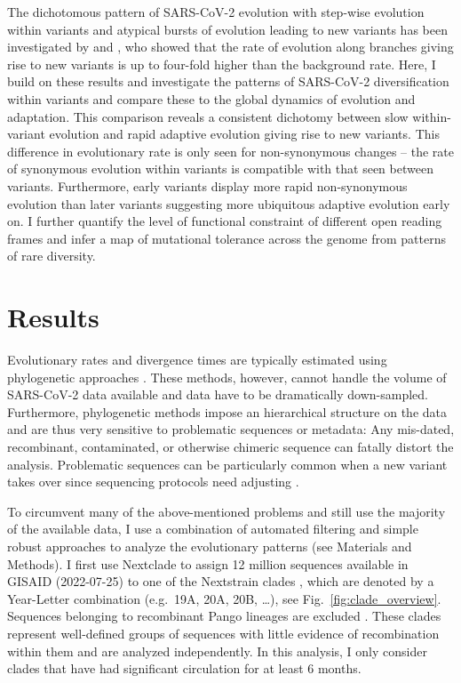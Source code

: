 \documentclass[aps,rmp, twocolumn]{revtex4}
\begin{document}
The dichotomous pattern of SARS-CoV-2 evolution with step-wise evolution within variants and atypical bursts of evolution leading to new variants has been investigated by \citet{tay_emergence_2022} and \citet{hill_origins_2022}, who showed that the rate of evolution along branches giving rise to new variants is up to four-fold higher than the background rate.
Here, I build on these results and investigate the patterns of SARS-CoV-2 diversification within variants and compare these to the global dynamics of evolution and adaptation.
This comparison reveals a consistent dichotomy between slow within-variant evolution and rapid adaptive evolution giving rise to new variants.
This difference in evolutionary rate is only seen for non-synonymous changes -- the rate of synonymous evolution within variants is compatible with that seen between variants.
Furthermore, early variants display more rapid non-synonymous evolution than later variants suggesting more ubiquitous adaptive evolution early on.
I further quantify the level of functional constraint of different open reading frames and infer a map of mutational tolerance across the genome from patterns of rare diversity.


\section*{Results}

Evolutionary rates and divergence times are typically estimated using phylogenetic approaches \citep{drummond_relaxed_2006}.
These methods, however, cannot handle the volume of SARS-CoV-2 data available and data have to be dramatically down-sampled.
Furthermore, phylogenetic methods impose an hierarchical structure on the data and are thus very sensitive to problematic sequences or metadata: Any mis-dated, recombinant, contaminated, or otherwise chimeric sequence can fatally distort the analysis.
Problematic sequences can be particularly common when a new variant takes over since sequencing protocols need adjusting \citep{deMaio_issues_2020}.

To circumvent many of the above-mentioned problems and still use the majority of the available data, I use a combination of automated filtering and simple robust approaches to analyze the evolutionary patterns (see Materials and Methods).
I first use Nextclade \citep{aksamentov_nextclade_2021} to assign 12 million sequences available in GISAID (2022-07-25) \citep{shu_gisaid_2017} to one of the Nextstrain clades \citep{hadfield_nextstrain_2018,roemer_sars-cov-2_2022}, which are denoted by a Year-Letter combination (e.g.~19A, 20A, 20B, \ldots), see Fig.~\ref{fig:clade_overview}.
Sequences belonging to recombinant Pango lineages are excluded \citep{rambaut_dynamic_2020}.
These clades represent well-defined groups of sequences with little evidence of recombination within them and are analyzed independently.
In this analysis, I only consider clades that have had significant circulation for at least 6 months.
\end{document}
